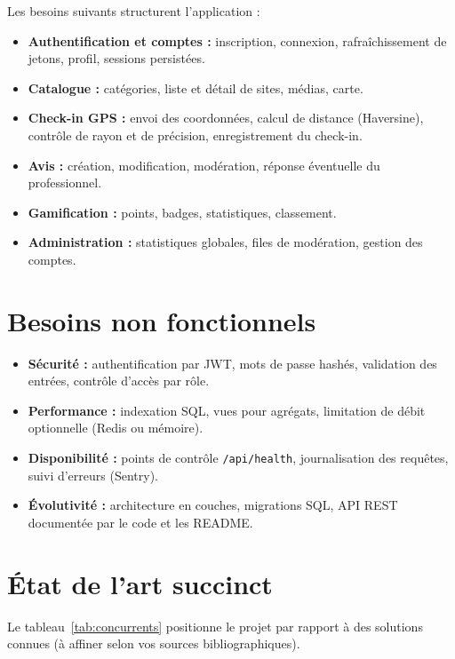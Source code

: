 Les besoins suivants structurent l'application :

\begin{itemize}[leftmargin=*]
  \item \textbf{Authentification et comptes :} inscription, connexion, rafraîchissement de jetons, profil, sessions persistées.
  \item \textbf{Catalogue :} catégories, liste et détail de sites, médias, carte.
  \item \textbf{Check-in GPS :} envoi des coordonnées, calcul de distance (Haversine), contrôle de rayon et de précision, enregistrement du check-in.
  \item \textbf{Avis :} création, modification, modération, réponse éventuelle du professionnel.
  \item \textbf{Gamification :} points, badges, statistiques, classement.
  \item \textbf{Administration :} statistiques globales, files de modération, gestion des comptes.
\end{itemize}

\section{Besoins non fonctionnels}

\begin{itemize}[leftmargin=*]
  \item \textbf{Sécurité :} authentification par JWT, mots de passe hashés, validation des entrées, contrôle d'accès par rôle.
  \item \textbf{Performance :} indexation SQL, vues pour agrégats, limitation de débit optionnelle (Redis ou mémoire).
  \item \textbf{Disponibilité :} points de contrôle \texttt{/api/health}, journalisation des requêtes, suivi d'erreurs (Sentry).
  \item \textbf{Évolutivité :} architecture en couches, migrations SQL, API REST documentée par le code et les README.
\end{itemize}

\section{État de l'art succinct}

Le tableau~\ref{tab:concurrents} positionne le projet par rapport à des solutions connues (à affiner selon vos sources bibliographiques).

